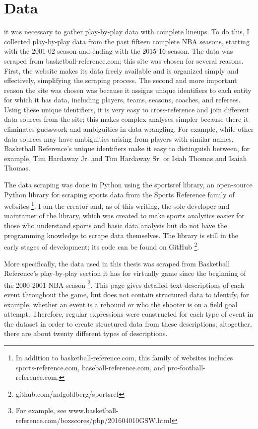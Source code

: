 
\chapter{Data} \label{ch:data} 
\nocite{*}

 it was necessary to gather
play-by-play data with complete lineups. To do this, I collected play-by-play data
from the past fifteen complete NBA seasons, starting with the 2001-02 season and
ending with the 2015-16 season. The data was scraped from basketball-reference.com;
this site was chosen for several reasons. First, the website makes its data freely
available and is organized simply and effectively, simplifying the scraping process.
The second and more important reason the site was chosen was because it assigns
unique identifiers to each entity for which it has data, including players, teams,
seasons, coaches, and referees.  Using these unique identifiers, it is very easy to
cross-reference and join different data sources from the site; this makes complex
analyses simpler because there it eliminates guesswork and ambiguities in data
wrangling. For example, while other data sources may have ambiguities arising from
players with similar names, Basketball Reference's unique identifiers make it easy
to distinguish between, for example, Tim Hardaway Jr.  and Tim Hardaway Sr. or Isiah
Thomas and Isaiah Thomas.

The data scraping was done in Python using the sportsref library, an open-source
Python library for scraping sports data from the Sports Reference family of websites
\footnote{In addition to basketball-reference.com, this family of websites
includes sports-reference.com, baseball-reference.com, and
pro-football-reference.com.}.
I am the creator and, as of this writing, the sole developer and maintainer of the
library, which was created to make sports analytics easier for those who understand
sports and basic data analysis but do not have the programming knowledge to scrape
data themselves. The library is still in the early stages of development; its
code can be found on GitHub
\footnote{github.com/mdgoldberg/sportsref}.

More specifically, the data used in this thesis was scraped from Basketball
Reference's play-by-play section it has for virtually game since the beginning of
the 2000-2001 NBA season \footnote{For example, see
www.basketball-reference.com/boxscores/pbp/201604010GSW.html}. This page gives
detailed text descriptions of each event throughout the game, but does not contain
structured data to identify, for example, whether an event is a rebound or who the
shooter is on a field goal attempt. Therefore, regular expressions were constructed
for each type of event in the dataset in order to create structured data from these
descriptions; altogether, there are about twenty different types of descriptions.

